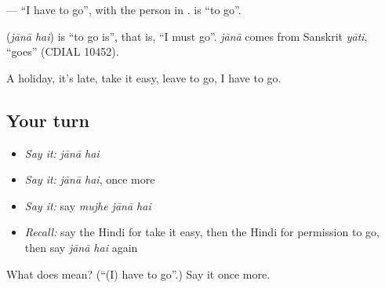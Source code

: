 \textbf{  } — \textquotedblleft{}I have to go\textquotedblright{}, with the person in \textbf{}. \textbf{} is \textquotedblleft{}to go\textquotedblright{}.

\begin{cousinweb}
\textbf{ } (\emph{jānā hai}) is \textquotedblleft{}to go is\textquotedblright{}, that is, \textquotedblleft{}I must go\textquotedblright{}. \emph{jānā} comes from Sanskrit \emph{yāti}, \textquotedblleft{}goes\textquotedblright{} (CDIAL 10452).
\end{cousinweb}

\begin{grammarlens}[title={What you've built}]
A holiday, it's late, take it easy, leave to go, I have to go.
\end{grammarlens}

\subsection*{Your turn}
\begin{itemize}
\raggedright
  \item \emph{Say it:} \emph{jānā hai}
  \item \emph{Say it:} \emph{jānā hai}, once more
  \item \emph{Say it:} say \emph{mujhe jānā hai}
  \item \emph{Recall:} say the Hindi for take it easy, then the Hindi for permission to go, then say \emph{jānā hai} again
\end{itemize}

\begin{tcolorbox}[breakable,colback=teal!4,colframe=teal!35!black,title={Before you move on}]
What does   mean? (\textquotedblleft{}(I) have to go\textquotedblright{}.) Say it once more.
\end{tcolorbox}
